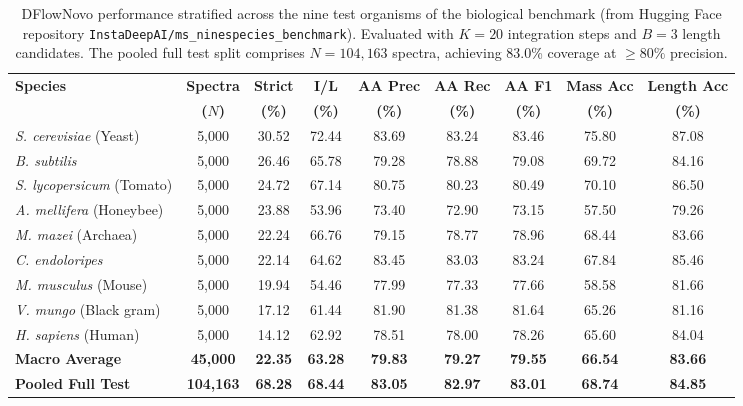 \begin{table}[!ht]
\centering
\small
\begin{tabular}{lcccccccc}
\toprule
\textbf{Species} & \textbf{Spectra} & \textbf{Strict} & \textbf{I/L} & \textbf{AA Prec} & \textbf{AA Rec} & \textbf{AA F1} & \textbf{Mass Acc} & \textbf{Length Acc} \\
& \textbf{($N$)} & \textbf{(\%)} & \textbf{(\%)} & \textbf{(\%)} & \textbf{(\%)} & \textbf{(\%)} & \textbf{(\%)} & \textbf{(\%)} \\
\midrule
\emph{S. cerevisiae} (Yeast) & 5,000 & 30.52 & 72.44 & 83.69 & 83.24 & 83.46 & 75.80 & 87.08 \\
\emph{B. subtilis} & 5,000 & 26.46 & 65.78 & 79.28 & 78.88 & 79.08 & 69.72 & 84.16 \\
\emph{S. lycopersicum} (Tomato) & 5,000 & 24.72 & 67.14 & 80.75 & 80.23 & 80.49 & 70.10 & 86.50 \\
\emph{A. mellifera} (Honeybee) & 5,000 & 23.88 & 53.96 & 73.40 & 72.90 & 73.15 & 57.50 & 79.26 \\
\emph{M. mazei} (Archaea) & 5,000 & 22.24 & 66.76 & 79.15 & 78.77 & 78.96 & 68.44 & 83.66 \\
\emph{C. endoloripes} & 5,000 & 22.14 & 64.62 & 83.45 & 83.03 & 83.24 & 67.84 & 85.46 \\
\emph{M. musculus} (Mouse) & 5,000 & 19.94 & 54.46 & 77.99 & 77.33 & 77.66 & 58.58 & 81.66 \\
\emph{V. mungo} (Black gram) & 5,000 & 17.12 & 61.44 & 81.90 & 81.38 & 81.64 & 65.26 & 81.16 \\
\emph{H. sapiens} (Human) & 5,000 & 14.12 & 62.92 & 78.51 & 78.00 & 78.26 & 65.60 & 84.04 \\
\midrule
\textbf{Macro Average} & \textbf{45,000} & \textbf{22.35} & \textbf{63.28} & \textbf{79.83} & \textbf{79.27} & \textbf{79.55} & \textbf{66.54} & \textbf{83.66} \\
\textbf{Pooled Full Test} & \textbf{104,163} & \textbf{68.28} & \textbf{68.44} & \textbf{83.05} & \textbf{82.97} & \textbf{83.01} & \textbf{68.74} & \textbf{84.85} \\
\bottomrule
\end{tabular}
\caption{DFlowNovo performance stratified across the nine test organisms of the biological benchmark \citep{Tran2017} (from Hugging Face repository \texttt{InstaDeepAI/ms\_ninespecies\_benchmark}). Evaluated with $K=20$ integration steps and $B=3$ length candidates. The pooled full test split comprises $N = 104,163$ spectra, achieving 83.0\% coverage at $\ge 80\%$ precision.}
\label{tab:species_stratification}
\end{table}

